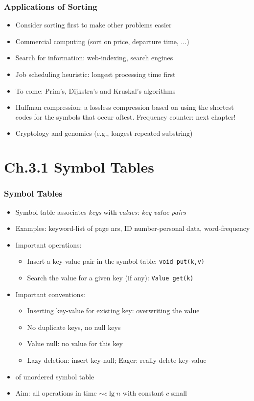 \documentclass[handout]{beamer}
\begin{document}
\begin{frame}
    \frametitle{Applications of Sorting}

\begin{itemize}[<+->]
\item Consider sorting first to make other problems easier
\item Commercial computing (sort on price, departure time, ...)
\item Search for information: web-indexing, search engines
\item Job scheduling heuristic: longest processing time first 
\item To come: Prim's, Dijkstra's  and Kruskal's algorithms
\item Huffman compression: a lossless compression based on using the
shortest codes for the symbols that occur oftest. Frequency counter:
next chapter!
\item Cryptology and genomics (e.g., longest repeated substring)
\end{itemize}     
\end{frame}

\section{Ch.3.1 Symbol Tables}

\begin{frame}
    \frametitle{Symbol Tables}

\begin{itemize}[<+->]
\item Symbol table associates \emph{keys} with \emph{values: key-value pairs}
\item Examples: keyword-list of page nrs, ID number-personal data, word-frequency
\item Important operations:
  \begin{itemize}[<+->]
  \item Insert a key-value pair in the symbol table: {\tt void put(k,v)}
  \item Search the value for a given key (if any): {\tt Value get(k)}
  \end{itemize}
\item Important conventions:
  \begin{itemize}[<+->]
  \item Inserting key-value for existing key: overwriting the value
  \item No duplicate keys, no null keys
  \item Value null: no value for this key
  \item Lazy deletion: insert key-null; Eager: really delete key-value
  \end{itemize} 
\item\href{http://algs4.cs.princeton.edu/code/javadoc/edu/princeton/cs/algs4/SequentialSearchST.html}%
{\color{red}{API}} of unordered symbol table
\item Aim: all operations in time $\sim c \lg n$ with constant $c$ small
\end{itemize}     
\end{frame}
\end{document}

